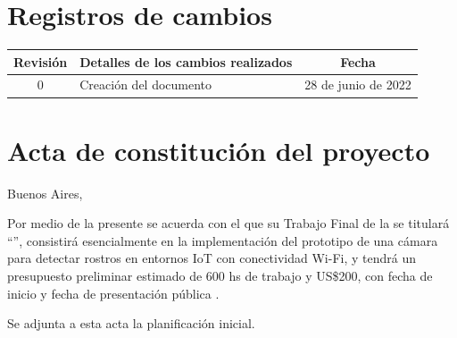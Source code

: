 \documentclass[
11pt, %
]{plan}
\begin{document}
\maketitle
\thispagestyle{empty}
\pagebreak


\thispagestyle{empty}
{\setlength{\parskip}{0pt}
\tableofcontents{}
}
\pagebreak


\section*{Registros de cambios}
\label{sec:registro}


\begin{table}[ht]
\label{tab:registro}
\centering
\begin{tabularx}{\linewidth}{@{}|c|X|c|@{}}
\hline
\rowcolor[HTML]{C0C0C0}
Revisión & \multicolumn{1}{c|}{\cellcolor[HTML]{C0C0C0}Detalles de los cambios realizados} & Fecha      \\ \hline
0      & Creación del documento				&28 de junio de 2022 \\ \hline
\end{tabularx}
\end{table}

\pagebreak



\section*{Acta de constitución del proyecto}
\label{sec:acta}

\begin{flushright}
Buenos Aires, \fechaInicioName
\end{flushright}

\vspace{2cm}

Por medio de la presente se acuerda con el \authorname\hspace{1px} que su Trabajo Final de la \degreename\hspace{1px} se titulará ``\ttitle'', consistirá esencialmente en la implementación del prototipo de una cámara para detectar rostros en entornos IoT con conectividad Wi-Fi, y tendrá un presupuesto preliminar estimado de 600 hs de trabajo y US\$200, con fecha de inicio \fechaInicioName\hspace{1px} y fecha de presentación pública \fechaFinalName.

Se adjunta a esta acta la planificación inicial.

\vfill
\end{document}

